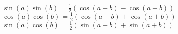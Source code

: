 		$\sin(a)\sin(b)=\frac{1}{2}(\cos(a-b)-\cos(a+b))$\\
		$\cos(a)\cos(b)=\frac{1}{2}(\cos(a-b)+\cos(a+b))$\\
		$\sin(a)\cos(b)=\frac{1}{2}(\sin(a-b)+\sin(a+b))$\\